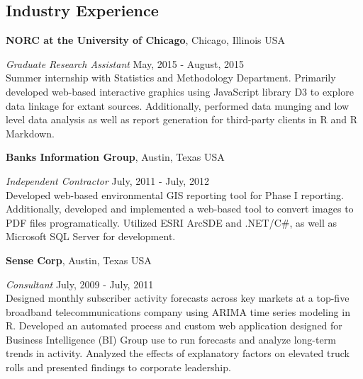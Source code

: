 \documentclass[margin,line]{res}
\begin{document}
\begin{resume}
% 
% 
% 

\section{\sc Industry Experience}
{\bf NORC at the University of Chicago}, Chicago, Illinois USA

\vspace{-.3cm}
{\em Graduate Research Assistant} \hfill {May, 2015 - August, 2015}\\
Summer internship with Statistics and Methodology Department. Primarily developed web-based interactive graphics using JavaScript library D3 to explore data linkage for extant sources. Additionally, performed data munging and low level data analysis as well as report generation for third-party clients in R and R Markdown.

{\bf Banks Information Group}, Austin, Texas USA

\vspace{-.3cm}
{\em Independent Contractor} \hfill {July, 2011 - July, 2012}\\
Developed web-based environmental GIS reporting tool for Phase I reporting. Additionally, developed and implemented a web-based tool to convert images to PDF files programatically.  Utilized ESRI ArcSDE and .NET/C\#, as well as Microsoft SQL Server for development.

{\bf Sense Corp}, Austin, Texas USA

\vspace{-.3cm}
{\em Consultant} \hfill {July, 2009 - July, 2011}\\
Designed monthly subscriber activity forecasts across key markets at a top-five broadband telecommunications company using ARIMA time series modeling in R. Developed an automated process and custom web application designed for Business Intelligence (BI) Group use to run forecasts and analyze long-term trends in activity. Analyzed the effects of explanatory factors on elevated truck rolls and presented findings to corporate leadership.


\end{resume}
\end{document}

